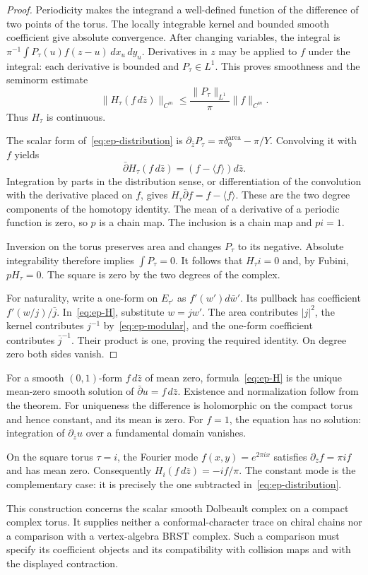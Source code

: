 \begin{proof}
Periodicity makes the integrand a well-defined function of the difference of two points of the torus.
The locally integrable kernel and bounded smooth coefficient give absolute convergence.
After changing variables, the integral is $\pi^{-1}\int P_\tau(u)f(z-u)\,dx_u\,dy_u$.
Derivatives in $z$ may be applied to $f$ under the integral: each derivative is bounded and $P_\tau\in L^1$.
This proves smoothness and the seminorm estimate
\[
 \|H_\tau(f\,d\bar z)\|_{C^m}
 \leq\frac{\|P_\tau\|_{L^1}}\pi\|f\|_{C^m}.
\]
Thus $H_\tau$ is continuous.

The scalar form of~\eqref{eq:ep-distribution} is
$\partial_{\bar z}P_\tau=\pi\delta^{\mathrm{area}}_0-\pi/Y$.
Convolving it with $f$ yields
\[
 \bar\partial H_\tau(f\,d\bar z)
       =(f-\langle f\rangle)d\bar z.
\]
Integration by parts in the distribution sense, or differentiation of the convolution with the derivative placed on $f$, gives
$H_\tau\bar\partial f=f-\langle f\rangle$.
These are the two degree components of the homotopy identity.
The mean of a derivative of a periodic function is zero, so $p$ is a chain map.
The inclusion is a chain map and $pi=1$.

Inversion on the torus preserves area and changes $P_\tau$ to its negative.
Absolute integrability therefore implies $\int P_\tau=0$.
It follows that $H_\tau i=0$ and, by Fubini, $pH_\tau=0$.
The square is zero by the two degrees of the complex.

For naturality, write a one-form on $E_{\tau'}$ as $f'(w')d\bar w'$.
Its pullback has coefficient $f'(w/j)/\bar j$.
In~\eqref{eq:ep-H}, substitute $w=jw'$.
The area contributes $|j|^2$, the kernel contributes $j^{-1}$ by~\eqref{eq:ep-modular}, and the one-form coefficient contributes $\bar j^{-1}$.
Their product is one, proving the required identity.
On degree zero both sides vanish.
\end{proof}

For a smooth $(0,1)$-form $f\,d\bar z$ of mean zero, formula~\eqref{eq:ep-H} is the unique mean-zero smooth solution of $\bar\partial u=f\,d\bar z$.
Existence and normalization follow from the theorem.
For uniqueness the difference is holomorphic on the compact torus and hence constant, and its mean is zero.
For $f=1$, the equation has no solution: integration of $\partial_{\bar z}u$ over a fundamental domain vanishes.

On the square torus $\tau=i$, the Fourier mode $f(x,y)=e^{2\pi i x}$ satisfies $\partial_{\bar z}f=\pi i f$ and has mean zero.
Consequently $H_i(f\,d\bar z)=-i f/\pi$.
The constant mode is the complementary case: it is precisely the one subtracted in~\eqref{eq:ep-distribution}.

This construction concerns the scalar smooth Dolbeault complex on a compact complex torus.
It supplies neither a conformal-character trace on chiral chains nor a comparison with a vertex-algebra BRST complex.
Such a comparison must specify its coefficient objects and its compatibility with collision maps and with the displayed contraction.
